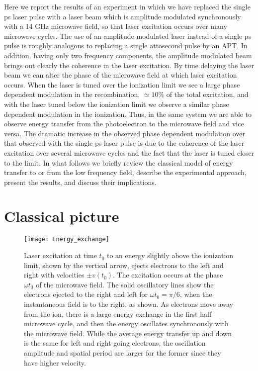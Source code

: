 \documentclass[pra, reprint]{revtex4-1}
\begin{document}
Here we report the results of an experiment in which we have replaced the single ps laser pulse with a laser beam which is amplitude modulated synchronously with a 14 GHz microwave field, so that laser excitation occurs over many microwave cycles. The use of an amplitude modulated laser instead of a single ps pulse is roughly analogous to replacing a single attosecond pulse by an APT. In addition, having only two frequency components, the amplitude modulated beam brings out clearly the coherence in the laser excitation. By time delaying the laser beam we can alter the phase of the microwave field at which laser excitation occurs. When the laser is tuned over the ionization limit we see a large phase dependent modulation in the recombination, $\simeq 10\%$ of the total excitation, and with the laser tuned below the ionization limit we observe a similar phase dependent modulation in the ionization. Thus, in the same system we are able to observe energy transfer from the photoelectron to the microwave field and vice versa. The dramatic increase in the observed phase dependent modulation over that observed with the single ps laser pulse is due to the coherence of the laser excitation over several microwave cycles and the fact that the laser is tuned closer to the limit. In what follows we briefly review the classical model of energy transfer to or from the low frequency field, describe the experimental approach, present the results, and discuss their implications.

\section{Classical picture}
\label{sec:classical-picture}


\begin{figure}[h]
  \texttt{[image: Energy\_exchange]}
  \caption{Laser excitation at time $t_0$ to an energy slightly above the ionization limit, shown by the vertical arrow, ejects electrons to the left and right with velocities $\pm v(t_0)$. The excitation occurs at the phase $\omega t_0$ of the microwave field. The solid oscillatory lines show the electrons ejected to the right and left for $\omega t_0 = \pi/6$, when the instantaneous field is to the right, as shown. As electrons move away from the ion, there is a large energy exchange in the first half microwave cycle, and then the energy oscillates synchronously with the microwave field. While the average energy transfer up and down is the same for left and right going electrons, the oscillation amplitude and spatial period are larger for the former since they have higher velocity.}
  \label{fig:Wexchange}
\end{figure}
\end{document}
